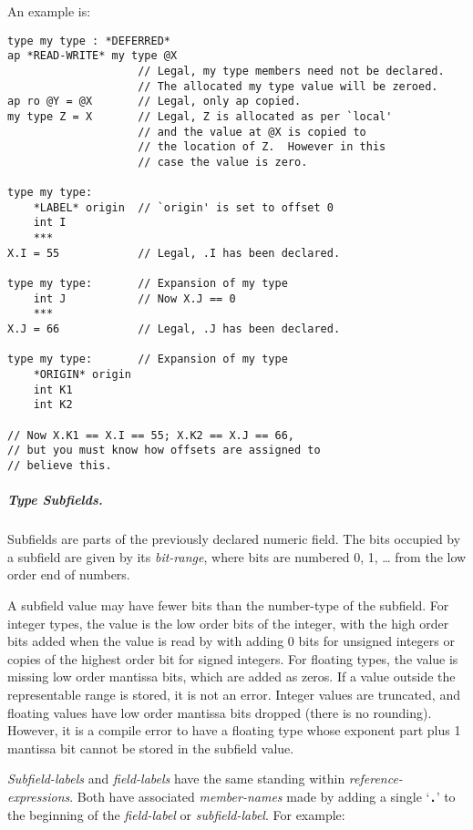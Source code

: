\documentclass[12pt]{article}
\newcommand{\subsubsubsubsection}[1]{\subparagraph[#1]{#1.}}
\newcommand{\TT}[1]{{\tt \bfseries #1}}
\newenvironment{indpar}[1][0.3in]%
	{\begin{list}{}%
		     {\setlength{\itemsep}{0in}%
		      \setlength{\topsep}{0in}%
		      \setlength{\parsep}{1ex}%
		      \setlength{\labelwidth}{#1}%
		      \setlength{\leftmargin}{#1}%
		      \addtolength{\leftmargin}{\labelsep}}%
	 \item}%
	{\end{list}}
\begin{document}
An example is:

\begin{indpar}\begin{verbatim}
type my type : *DEFERRED*
ap *READ-WRITE* my type @X
                    // Legal, my type members need not be declared.
                    // The allocated my type value will be zeroed.
ap ro @Y = @X       // Legal, only ap copied.
my type Z = X       // Legal, Z is allocated as per `local'
                    // and the value at @X is copied to
                    // the location of Z.  However in this
                    // case the value is zero.

type my type:
    *LABEL* origin  // `origin' is set to offset 0
    int I
    ***
X.I = 55            // Legal, .I has been declared.

type my type:       // Expansion of my type
    int J           // Now X.J == 0
    ***
X.J = 66            // Legal, .J has been declared.

type my type:       // Expansion of my type
    *ORIGIN* origin
    int K1
    int K2

// Now X.K1 == X.I == 55; X.K2 == X.J == 66,
// but you must know how offsets are assigned to
// believe this.
\end{verbatim}\end{indpar}

\subsubsubsubsection{Type Subfields}

Subfields are parts of the previously declared numeric field.
The bits occupied
by a subfield are given by its {\em bit-range}, where bits are numbered
0, 1, \ldots{} from the low order end of numbers.

A subfield value may have fewer bits than the number-type of the subfield.
For integer types, the value is the low order bits of the integer, with
the high order bits added when the value is read by with adding 0 bits
for unsigned integers or copies of the highest order bit for signed integers.
For floating types, the value is missing low order mantissa bits, which
are added as zeros.  If a value outside the representable range is stored,
it is not an error.  Integer values are truncated, and floating values
have low order mantissa bits dropped (there is no rounding).  However, it is
a compile error to have a floating type whose exponent part plus
1 mantissa bit cannot be stored in the subfield value.

{\em Subfield-labels} and {\em field-labels} have the same standing within
{\em reference-expressions}.
Both have associated {\em member-names} made by adding a single
`\TT{.}' to the beginning of the {\em field-label} or {\em subfield-label}.
For example:
\end{document}

